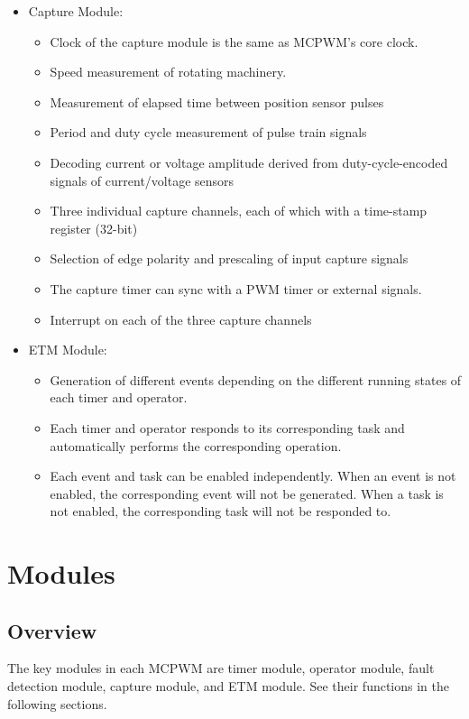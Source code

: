 \documentclass[main\_\_EN.tex]{subfiles}
\begin{document}
\begin{itemize}
    \item Capture Module:
        \begin{itemize}
            \item Clock of the capture module is the same as MCPWM's core clock.
            \item Speed measurement of rotating machinery.
            \item Measurement of elapsed time between position sensor pulses
            \item Period and duty cycle measurement of pulse train signals
            \item Decoding current or voltage amplitude derived from duty-cycle-encoded signals of current/voltage sensors
            \item Three individual capture channels, each of which with a time-stamp register (32-bit)
            \item Selection of edge polarity and prescaling of input capture signals
            \item The capture timer can sync with a PWM timer or external signals.
            \item Interrupt on each of the three capture channels
        \end{itemize}
    \item ETM Module:
        \begin{itemize}
            \item Generation of different events depending on the different running states of each timer and operator.
            \item Each timer and operator responds to its corresponding task and automatically performs the corresponding operation.
            \item Each event and task can be enabled independently. When an event is not enabled, the corresponding event will not be generated. When a task is not enabled, the corresponding task will not be responded to.
        \end{itemize}
\end{itemize}
\newpage

\section{Modules}
\subsection{Overview}

The key modules in each MCPWM are timer module, operator module, fault detection module, capture module, and ETM module. See their functions in the following sections.
\end{document}
